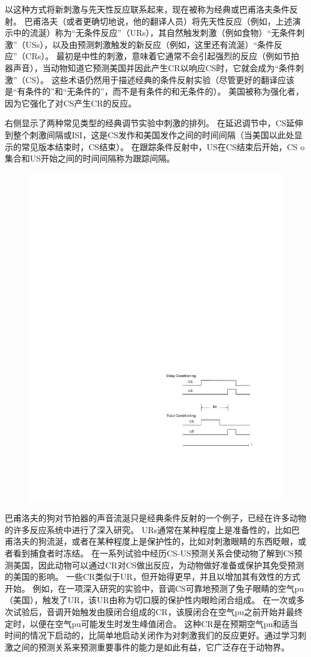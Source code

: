 以这种方式将新刺激与先天性反应联系起来，现在被称为经典或巴甫洛夫条件反射。
巴甫洛夫（或者更确切地说，他的翻译人员）将先天性反应（例如，上述演示中的流涎）称为“无条件反应”（URs），其自然触发刺激（例如食物）“无条件刺激”（USs），以及由预测刺激触发的新反应（例如，这里还有流涎）“条件反应”（CRs）。
最初是中性的刺激，意味着它通常不会引起强烈的反应（例如节拍器声音），当动物知道它预测美国并因此产生CR以响应CS时，它就会成为“条件刺激”（CS）。
这些术语仍然用于描述经典的条件反射实验（尽管更好的翻译应该是“有条件的”和“无条件的”，而不是有条件的和无条件的）。
美国被称为强化者，因为它强化了对CS产生CR的反应。


右侧显示了两种常见类型的经典调节实验中刺激的排列。
在延迟调节中，CS延伸到整个刺激间隔或ISI，这是CS发作和美国发作之间的时间间隔（当美国以此处显示的常见版本结束时，CS结束）。
在跟踪条件反射中，US在CS结束后开始，CS o集合和US开始之间的时间间隔称为跟踪间隔。


\begin{figure}[!htb]
	\centering
	\includegraphics[width=0.5\linewidth]{chap11/fig_11_0}
	\caption{  \label{fig:11_0}}
\end{figure}


巴甫洛夫的狗对节拍器的声音流涎只是经典条件反射的一个例子，已经在许多动物的许多反应系统中进行了深入研究。
URs通常在某种程度上是准备性的，比如巴甫洛夫的狗流涎，或者在某种程度上是保护性的，比如对刺激眼睛的东西眨眼，或者看到捕食者时冻结。
在一系列试验中经历CS-US预测关系会使动物了解到CS预测美国，因此动物可以通过CR对CS做出反应，为动物做好准备或保护其免受预测的美国的影响。
一些CR类似于UR，但开始得更早，并且以增加其有效性的方式开始。
例如，在一项深入研究的实验中，音调CS可靠地预测了兔子眼睛的空气pu（美国），触发了UR，该UR由称为切口膜的保护性内眼睑闭合组成。
在一次或多次试验后，音调开始触发由膜闭合组成的CR，该膜闭合在空气pu之前开始并最终定时，以便在空气pu可能发生时发生峰值闭合。
这种CR是在预期空气pu和适当时间的情况下启动的，比简单地启动关闭作为对刺激我们的反应更好。通过学习刺激之间的预测关系来预测重要事件的能力是如此有益，它广泛存在于动物界。





